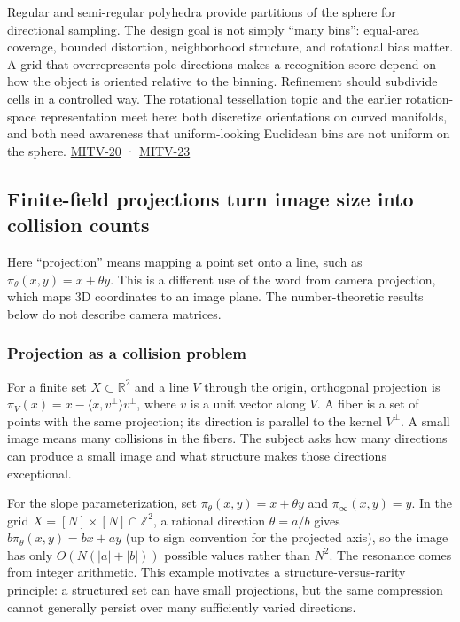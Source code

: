 Regular and semi-regular polyhedra provide partitions of the sphere for directional sampling. The design goal is not simply ``many bins'': equal-area coverage, bounded distortion, neighborhood structure, and rotational bias matter. A grid that overrepresents pole directions makes a recognition score depend on how the object is oriented relative to the binning. Refinement should subdivide cells in a controlled way. The rotational tessellation topic and the earlier rotation-space representation meet here: both discretize orientations on curved manifolds, and both need awareness that uniform-looking Euclidean bins are not uniform on the sphere. \hyperref[04-visual-computing-ii-ch036]{MITV-20} · \hyperref[04-visual-computing-ii-ch036]{MITV-23}

\subsection{Finite-field projections turn image size into collision counts}\label{finite-field-projections-turn-image-size-into-collision-counts}

Here ``projection'' means mapping a point set onto a line, such as \(\pi_\theta(x,y)=x+\theta y\). This is a different use of the word from camera projection, which maps 3D coordinates to an image plane. The number-theoretic results below do not describe camera matrices.

\subsubsection{Projection as a collision problem}\label{projection-as-a-collision-problem}

For a finite set \(X\subset\mathbb R^2\) and a line \(V\) through the origin, orthogonal projection is \(\pi_V(x)=x-\langle x,v^\perp\rangle v^\perp\), where \(v\) is a unit vector along \(V\). A fiber is a set of points with the same projection; its direction is parallel to the kernel \(V^\perp\). A small image means many collisions in the fibers. The subject asks how many directions can produce a small image and what structure makes those directions exceptional.

For the slope parameterization, set \(\pi_\theta(x,y)=x+\theta y\) and \(\pi_\infty(x,y)=y\). In the grid \(X=[N]\times[N]\cap\mathbb Z^2\), a rational direction \(\theta=a/b\) gives \(b\pi_\theta(x,y)=bx+ay\) (up to sign convention for the projected axis), so the image has only \(O(N(|a|+|b|))\) possible values rather than \(N^2\). The resonance comes from integer arithmetic. This example motivates a structure-versus-rarity principle: a structured set can have small projections, but the same compression cannot generally persist over many sufficiently varied directions.

